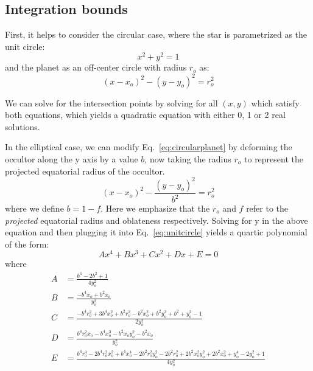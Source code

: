 \documentclass[twocolumn]{aastex631}
\begin{document}
\subsection{Integration bounds}
First, it helps to consider the circular case, where the star is parametrized as the unit circle:
\begin{equation} \label{eq:unitcircle}
x^2 + y^2 = 1
\end{equation}
and the planet as an off-center circle with radius $r_{o}$ as:
\begin{equation} \label{eq:circularplanet}
(x-x_o)^2-(y-y_o)^2 = r_o^2
\end{equation}

We can solve for the intersection points by solving for all $(x,y)$ which satisfy both equations, which yields a quadratic equation with either 0, 1 or 2 real solutions.

In the elliptical case, we can modify Eq.~\ref{eq:circularplanet} by deforming the occultor along the y axis by a value $b$, now taking the radius $r_o$ to represent the projected equatorial radius of the occultor. 
\begin{equation} \label{eq:ellipticalplanet}
(x-x_{o})^2-\frac{(y-y_o)^2}{b^2} = r_o^2
\end{equation}
where we define $b=1-f$. Here we emphasize that the $r_o$ and $f$ refer to the \textit{projected} equatorial radius and oblateness respectively. 
Solving for y in the above equation and then plugging it into Eq.~\ref{eq:unitcircle} yields a quartic polynomial of the form: 
\begin{equation} \label{eq:quarticform}
Ax^4 + Bx^3 + Cx^2 + Dx + E = 0
\end{equation} 
where
\onecolumngrid
\begin{equation} \label{eq:quarticcoeffs}
\begin{aligned}
A &= \frac{b^4 - 2b^2 + 1}{4y_o^2}\\
B &= \frac{-b^4x_o + b^2x_o}{y_o^2}\\
C &= \frac{-b^4r_o^2 + 3b^4x_o^2 + b^2r_o^2 - b^2x_o^2 + b^2y_o^2 + b^2 + y_o^2 - 1}{2y_o^2} \\
D &= \frac{b^4r_o^2x_o - b^4x_o^3 - b^2x_oy_o^2 - b^2x_o}{y_o^2} \\
E &= \frac{b^4r_o^4 - 2b^4r_o^2x_o^2 + b^4x_o^4 - 2b^2r_o^2y_o^2 - 2b^2r_o^2 + 2b^2x_o^2y_o^2 + 2b^2x_o^2 + y_o^4 - 2y_o^2 + 1}{4y_o^2}\\
\end{aligned}
\end{equation}
\end{document}
